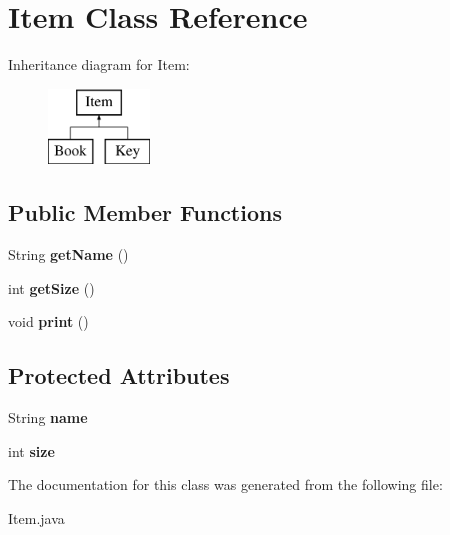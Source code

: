 \hypertarget{class_item}{}\section{Item Class Reference}
\label{class_item}
Inheritance diagram for Item\+:\begin{figure}[H]
\begin{center}
\leavevmode
\includegraphics[height=2.000000cm]{class_item}
\end{center}
\end{figure}
\subsection*{Public Member Functions}
\begin{DoxyCompactItemize}
\item 
\hypertarget{class_item_a78dd5a8370c5267c3f1f992167ab84ac}{}String {\bfseries get\+Name} ()\label{class_item_a78dd5a8370c5267c3f1f992167ab84ac}

\item 
\hypertarget{class_item_a639ccc11f3e820d7e39d11d27a00848c}{}int {\bfseries get\+Size} ()\label{class_item_a639ccc11f3e820d7e39d11d27a00848c}

\item 
\hypertarget{class_item_ae3bfa18643ec750ff3d3623b3c120c36}{}void {\bfseries print} ()\label{class_item_ae3bfa18643ec750ff3d3623b3c120c36}

\end{DoxyCompactItemize}
\subsection*{Protected Attributes}
\begin{DoxyCompactItemize}
\item 
\hypertarget{class_item_a42fd6d4796fcf652806278f65ce93a3b}{}String {\bfseries name}\label{class_item_a42fd6d4796fcf652806278f65ce93a3b}

\item 
\hypertarget{class_item_a8629eea6d98387a8c6d4647050feaa84}{}int {\bfseries size}\label{class_item_a8629eea6d98387a8c6d4647050feaa84}

\end{DoxyCompactItemize}


The documentation for this class was generated from the following file\+:\begin{DoxyCompactItemize}
\item 
Item.\+java\end{DoxyCompactItemize}
